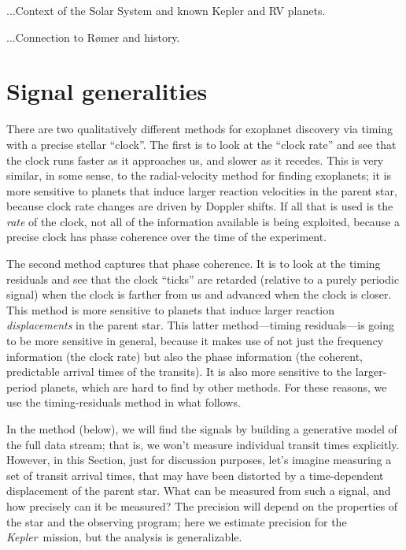\documentclass[12pt, preprint]{aastex}
\newcommand{\sectionname}{Section}
\newcommand{\project}[1]{\textsl{#1}}
\newcommand{\Kepler}{\project{Kepler}}
\begin{document}
...Context of the Solar System and known Kepler and RV planets.

...Connection to R\o mer and history.

\section{Signal generalities}

There are two qualitatively different methods for exoplanet discovery
via timing with a precise stellar ``clock''.
The first is to look at the ``clock rate'' and see that the clock runs
faster as it approaches us, and slower as it recedes.
This is very similar, in some sense, to the radial-velocity method for
finding exoplanets; it is more sensitive to planets that induce larger
reaction velocities in the parent star, because clock rate changes are
driven by Doppler shifts.
If all that is used is the \emph{rate} of the clock, not all of the
information available is being exploited, because a precise clock has
phase coherence over the time of the experiment.

The second method captures that phase coherence.
It is to look at the timing residuals and see that the clock ``ticks''
are retarded (relative to a purely periodic signal) when the clock is
farther from us and advanced when the clock is closer.
This method is more sensitive to planets that induce larger reaction
\emph{displacements} in the parent star.
This latter method---timing residuals---is going to be more sensitive
in general, because it makes use of not just the frequency information
(the clock rate) but also the phase information (the coherent,
predictable arrival times of the transits).
It is also more sensitive to the larger-period planets, which are hard
to find by other methods.
For these reasons, we use the timing-residuals method in what follows.

In the method (below), we will find the signals by building a
generative model of the full data stream; that is, we won't measure
individual transit times explicitly.
However, in this \sectionname, just for discussion purposes, let's
imagine measuring a set of transit arrival times, that may have been
distorted by a time-dependent displacement of the parent star.  What
can be measured from such a signal, and how precisely can it be
measured?
The precision will depend on the properties of the star and the
observing program; here we estimate precision for the
\Kepler\ mission, but the analysis is generalizable.
\end{document}
